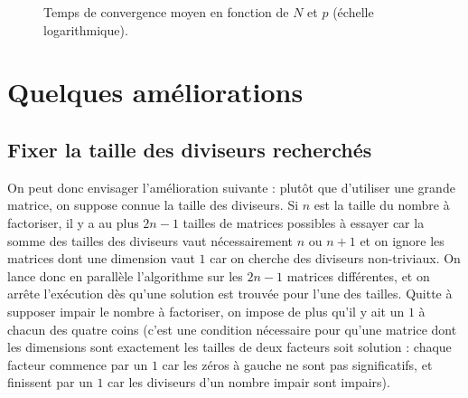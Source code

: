 \documentclass[11pt, openany]{article}
\begin{document}
\begin{figure}
  \centering
  \caption{Temps de convergence moyen en fonction de $N$ et $p$ (échelle logarithmique).}
\end{figure}  





\section*{Quelques améliorations}

\subsection*{Fixer la taille des diviseurs recherchés}

On peut donc envisager l'amélioration suivante : plutôt que d'utiliser une grande matrice, on suppose connue la taille des diviseurs. Si $n$ est la taille du nombre à factoriser, il y a au plus $2n-1$ tailles de matrices possibles à essayer car la somme des tailles des diviseurs vaut nécessairement $n$ ou $n+1$ et on ignore les matrices dont une dimension vaut $1$ car on cherche des diviseurs non-triviaux. On lance donc en parallèle l'algorithme sur les $2n-1$ matrices différentes, et on arrête l'exécution dès qu'une solution est trouvée pour l'une des tailles. Quitte à supposer impair le nombre à factoriser, on impose de plus qu'il y ait un $1$ à chacun des quatre coins (c'est une condition nécessaire pour qu'une matrice dont les dimensions sont exactement les tailles de deux facteurs soit solution : chaque facteur commence par un $1$ car les zéros à gauche ne sont pas significatifs, et finissent par un $1$ car les diviseurs d'un nombre impair sont impairs). 
\end{document}
